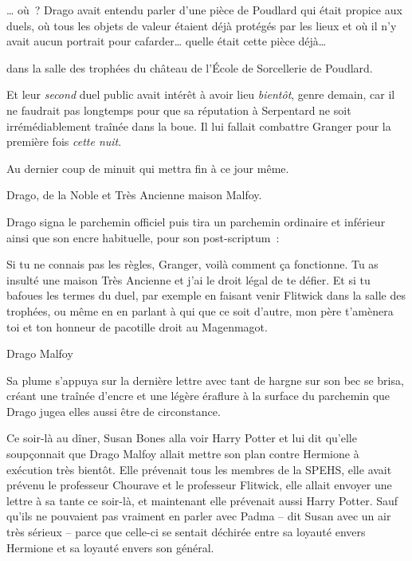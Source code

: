 … où~? Drago avait entendu parler d'une pièce de Poudlard qui était propice aux duels, où tous les objets de valeur étaient déjà protégés par les lieux et où il n'y avait aucun portrait pour cafarder… quelle était cette pièce déjà…

\begin{writtenNote}
dans la salle des trophées du château de l'École de Sorcellerie de Poudlard.
\end{writtenNote}

Et leur \emph{second} duel public avait intérêt à avoir lieu \emph{bientôt}, genre demain, car il ne faudrait pas longtemps pour que sa réputation à Serpentard ne soit irrémédiablement traînée dans la boue.
Il lui fallait combattre Granger pour la première fois \emph{cette nuit}.

\begin{writtenNote}
Au dernier coup de minuit qui mettra fin à ce jour même.

Drago, de la Noble et Très Ancienne maison Malfoy.
\end{writtenNote}

Drago signa le parchemin officiel puis tira un parchemin ordinaire et inférieur ainsi que son encre habituelle, pour son post-scriptum~:

\begin{writtenNote}Si tu ne connais pas les règles, Granger, voilà comment ça fonctionne.
Tu as insulté une maison Très Ancienne et j'ai le droit légal de te défier.
Et si tu bafoues les termes du duel, par exemple en faisant venir Flitwick dans la salle des trophées, ou même en en parlant à qui que ce soit d'autre, mon père t'amènera toi et ton honneur de pacotille droit au Magenmagot.

Drago Malfoy
\end{writtenNote}

Sa plume s'appuya sur la dernière lettre avec tant de hargne sur son bec se brisa, créant une traînée d'encre et une légère éraflure à la surface du parchemin que Drago jugea elles aussi être de circonstance.

\later

Ce soir-là au dîner, Susan Bones alla voir Harry Potter et lui dit qu'elle soupçonnait que Drago Malfoy allait mettre son plan contre Hermione à exécution très bientôt.
Elle prévenait tous les membres de la SPEHS, elle avait prévenu le professeur Chourave et le professeur Flitwick, elle allait envoyer une lettre à sa tante ce soir-là, et maintenant elle prévenait aussi Harry Potter.
Sauf qu'ils ne pouvaient pas vraiment en parler avec Padma -- dit Susan avec un air très sérieux -- parce que celle-ci se sentait déchirée entre sa loyauté envers Hermione et sa loyauté envers son général.

